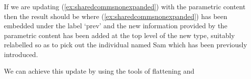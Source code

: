 If we are updating (\ref{ex:sharedcommsnonexpanded}) with the parametric
content  then the result should be \nexteg{} where
(\ref{ex:sharedcommsnonexpanded}) has been embedded under the label
`prev' and the new information provided by the parametric content has
been added at the top level of the new type, suitably relabelled so as
to pick out the individual named Sam which has been previously introduced.
\begin{ex}

\end{ex}
We can achieve this update by using the tools of flattening and
